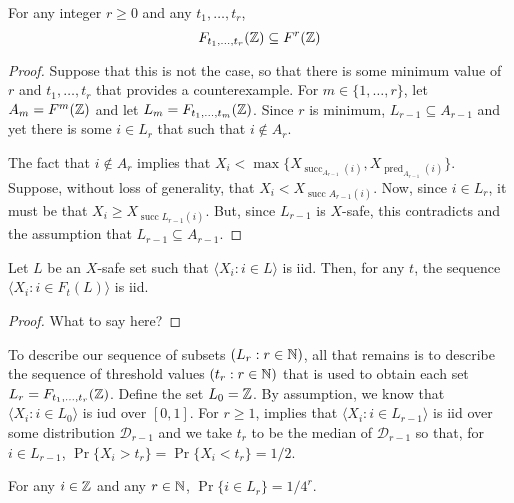 \documentclass{patmorin}
\DeclareMathOperator{\cw}{succ}
\DeclareMathOperator{\ccw}{pred}
\begin{document}
\begin{lem}
   For any integer $r\ge 0$ and any $t_1,\ldots,t_r$,
   \[  F_{t_1,\ldots,t_r}(\mathbb{Z}) \subseteq F^{r}(\mathbb{Z})   \]
\end{lem}

\begin{proof}
   Suppose that this is not the case, so that there is some
   minimum value of $r$ and $t_1,\ldots,t_r$ that provides a
   counterexample.  For $m\in\{1,\ldots,r\}$, let $A_m=F^{m}(\mathbb{Z})$ and let
   $L_m=F_{t_1,\ldots,t_m}(\mathbb{Z})$.  Since $r$ is minimum, $L_{r-1}\subseteq
   A_{r-1}$ and yet there is some $i\in L_r$ that such that $i\not\in
   A_r$.

   The fact that $i\not\in A_r$ implies that $X_i
   < \max\{X_{\cw_{A_{r-1}}(i)},X_{\ccw_{A_{r-1}}(i)}\}$.
   Suppose, without loss of generality, that $X_i < X_{\cw{A_{r-1}}(i)}$.
   Now, since $i\in L_r$, it must be that $X_i
   \ge X_{\cw{L_{r-1}}(i)}$.  But, since $L_{r-1}$ is
   $X$-safe, this contradicts  and the assumption that
   $L_{r-1}\subseteq A_{r-1}$.
\end{proof}

\begin{lem}
   Let $L$ be an $X$-safe set such that $\langle X_i:i\in L\rangle$ is iid.  Then, for any $t$, the sequence $\langle X_i: i\in F_t(L)\rangle$ is iid.
\end{lem}

\begin{proof}
   What to say here?
\end{proof}

To describe our sequence of subsets $(L_r: r\in\mathbb{N})$, all that remains
is to describe the sequence of threshold values $(t_r:r\in\mathbb{N})$ that is
used to obtain each set $L_r = F_{t_1,\ldots,t_r}(\mathbb{Z})$.  Define the
set $L_0=\mathbb{Z}$.  By assumption, we know that $\langle X_i:i\in L_0\rangle$ is iud
over $[0,1]$.  For $r\ge 1$,  implies that $\langle X_i:i\in
L_{r-1}\rangle$ is iid over some distribution $\mathcal{D}_{r-1}$ and we take
$t_r$ to be the median of $\mathcal{D}_{r-1}$ so that, for $i\in L_{r-1}$,
$\Pr\{X_i > t_r\}=\Pr\{X_i < t_r\} = 1/2$.

\begin{lem}
   For any $i\in\mathbb{Z}$ and any $r\in\mathbb{N}$, $\Pr\{i\in L_r\} = 1/4^r$.
\end{lem}
\end{document}
